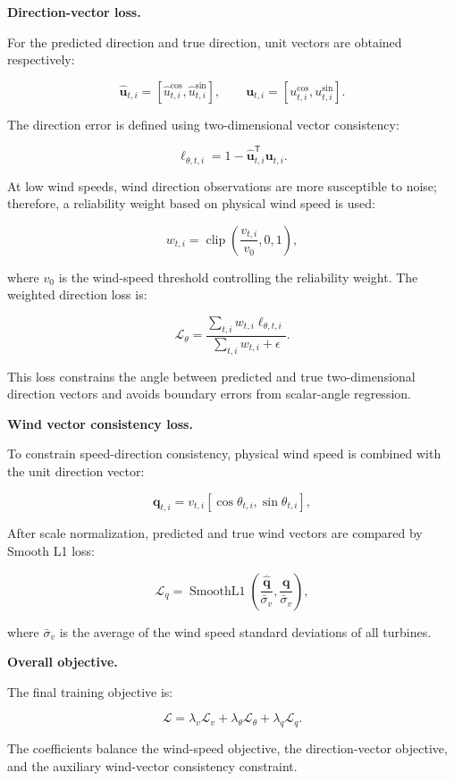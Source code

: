\textbf{Direction-vector loss.}

For the predicted direction and true direction, unit vectors are obtained respectively:

\begin{equation}
\hat{\mathbf{u}}_{t,i} = [\hat{u}^{\cos}_{t,i}, \hat{u}^{\sin}_{t,i}], \qquad \mathbf{u}_{t,i} = [u^{\cos}_{t,i}, u^{\sin}_{t,i}].
\end{equation}

The direction error is defined using two-dimensional vector consistency:

\begin{equation}
\ell_{\theta,t,i} = 1 - \hat{\mathbf{u}}_{t,i}^{\mathsf{T}} \mathbf{u}_{t,i}.
\end{equation}

At low wind speeds, wind direction observations are more susceptible to noise; therefore, a reliability weight based on physical wind speed is used:

\begin{equation}
w_{t,i} = \operatorname{clip} \left( \frac{v_{t,i}}{v_0}, 0, 1 \right),
\end{equation}

where $v_0$ is the wind-speed threshold controlling the reliability weight. The weighted direction loss is:

\begin{equation}
\mathcal{L}_{\theta} = \frac{\sum_{t,i}w_{t,i}\ell_{\theta,t,i}}{\sum_{t,i}w_{t,i}+\epsilon}.
\end{equation}

This loss constrains the angle between predicted and true two-dimensional direction vectors and avoids boundary errors from scalar-angle regression.

\textbf{Wind vector consistency loss.}

To constrain speed-direction consistency, physical wind speed is combined with the unit direction vector:

\begin{equation}
\mathbf{q}_{t,i} = v_{t,i} \left[ \cos\theta_{t,i}, \sin\theta_{t,i} \right],
\end{equation}

After scale normalization, predicted and true wind vectors are compared by Smooth L1 loss:

\begin{equation}
\mathcal{L}_{q} = \operatorname{SmoothL1} \left( \frac{\hat{\mathbf{q}}}{\bar{\sigma}_v}, \frac{\mathbf{q}}{\bar{\sigma}_v} \right),
\end{equation}

where $\bar{\sigma}_v$ is the average of the wind speed standard deviations of all turbines.

\textbf{Overall objective.}

The final training objective is:

\begin{equation}
\mathcal{L} = \lambda_v\mathcal{L}_{v} + \lambda_\theta\mathcal{L}_{\theta} + \lambda_q\mathcal{L}_{q}.
\end{equation}

The coefficients balance the wind-speed objective, the direction-vector objective, and the auxiliary wind-vector consistency constraint.

